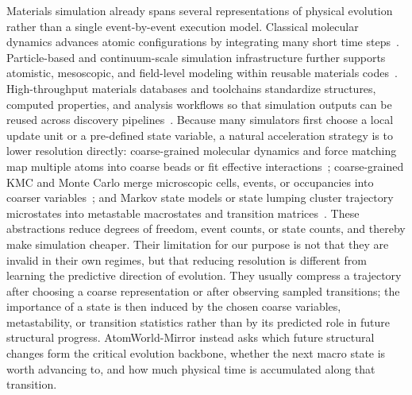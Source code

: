 \documentclass{article}
\begin{document}
Materials simulation already spans several representations of physical evolution rather than a single event-by-event execution model. Classical molecular dynamics advances atomic configurations by integrating many short time steps~\cite{alder1959md,rahman1964argon,verlet1967fluids,plimpton1995fast,thompson2022lammps}. Particle-based and continuum-scale simulation infrastructure further supports atomistic, mesoscopic, and field-level modeling within reusable materials codes~\cite{thompson2022lammps}. High-throughput materials databases and toolchains standardize structures, computed properties, and analysis workflows so that simulation outputs can be reused across discovery pipelines~\cite{jain2013materialsproject,curtarolo2012aflow,ong2013pymatgen,ward2018matminer,choudhary2020jarvis}. Because many simulators first choose a local update unit or a pre-defined state variable, a natural acceleration strategy is to lower resolution directly: coarse-grained molecular dynamics and force matching map multiple atoms into coarse beads or fit effective interactions~\cite{marrink2007martini,noid2008mscg}; coarse-grained KMC and Monte Carlo merge microscopic cells, events, or occupancies into coarser variables~\cite{garnier2013cgkmc}; and Markov state models or state lumping cluster trajectory microstates into metastable macrostates and transition matrices~\cite{chodera2014msm}. These abstractions reduce degrees of freedom, event counts, or state counts, and thereby make simulation cheaper. Their limitation for our purpose is not that they are invalid in their own regimes, but that reducing resolution is different from learning the predictive direction of evolution. They usually compress a trajectory after choosing a coarse representation or after observing sampled transitions; the importance of a state is then induced by the chosen coarse variables, metastability, or transition statistics rather than by its predicted role in future structural progress. AtomWorld-Mirror instead asks which future structural changes form the critical evolution backbone, whether the next macro state is worth advancing to, and how much physical time is accumulated along that transition.
\end{document}
